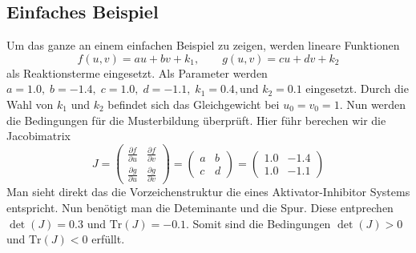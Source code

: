 \subsection{Einfaches Beispiel}
Um das ganze an einem einfachen Beispiel zu zeigen, werden lineare Funktionen
\begin{equation}
f(u, v) = a u + b v + k_1, \qquad
g(u, v) = c u + d v + k_2
\label{reaktdiff:equ:ownreakterm}
\end{equation}
als Reaktionsterme eingesetzt.
Als Parameter werden \( a = 1.0,\; b = -1.4,\; c = 1.0,\; d = -1.1,\; k_1 = 0.4,\text{und }k_2 = 0.1 \) eingesetzt.
Durch die Wahl von \(k_1\) und \(k_2\) befindet sich das Gleichgewicht bei \(u_0 = v_0 = 1\).
Nun werden die Bedingungen für die Musterbildung überprüft.
Hier führ berechen wir die Jacobimatrix
\begin{equation*}
        J =
        \begin{pmatrix}
        \frac{\partial f}{\partial u} & \frac{\partial f}{\partial v} \\
        \frac{\partial g}{\partial u} & \frac{\partial g}{\partial v}
        \end{pmatrix}
        =
        \begin{pmatrix}
        a & b \\
        c & d
        \end{pmatrix}
        =
        \begin{pmatrix}
        1.0 & -1.4 \\
        1.0 & -1.1
        \end{pmatrix}
\end{equation*}
Man sieht direkt das die Vorzeichenstruktur die eines Aktivator-Inhibitor Systems entspricht.
Nun benötigt man die Deteminante und die Spur.
Diese entprechen \(\det(J) = 0.3\) und \(\text{Tr}(J) = -0.1\).
Somit sind die Bedingungen \(\det(J) > 0\) und \(\text{Tr}(J) <0\) erfüllt.

